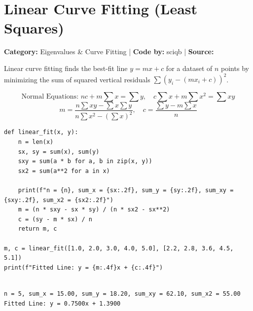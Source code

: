 \documentclass[10pt,a4paper]{report}
\begin{document}
\newpage


\section{Linear Curve Fitting (Least Squares)}
\textbf{Category:} \textcolor{secondary}{Eigenvalues \& Curve Fitting} \quad | \quad \textbf{Code by:} \textcolor{secondary}{sciqb} \quad | \quad \textbf{Source:} \texttt{}

Linear curve fitting finds the best-fit line $y = mx + c$ for a dataset of $n$ points by minimizing the sum of squared vertical residuals $\sum (y_i - (mx_i + c))^2$.

\begin{tcolorbox}[colback=theorybg,colframe=theoryframe,title=\textbf{Mathematical Theory \& Formulation},boxrule=1pt,arc=2mm]
\[
\text{Normal Equations: } n c + m \sum x = \sum y, \quad c \sum x + m \sum x^2 = \sum x y
\]
\[
m = \frac{n \sum xy - \sum x \sum y}{n \sum x^2 - (\sum x)^2}, \quad c = \frac{\sum y - m \sum x}{n}
\]
\end{tcolorbox}

\begin{tcolorbox}[colback=codebg,colframe=secondary,title=\textbf{Python Implementation (Step-by-Step Functions)},boxrule=1pt,arc=2mm]
\begin{lstlisting}[style=python_detailed]
def linear_fit(x, y):
    n = len(x)
    sx, sy = sum(x), sum(y)
    sxy = sum(a * b for a, b in zip(x, y))
    sx2 = sum(a**2 for a in x)

    print(f"n = {n}, sum_x = {sx:.2f}, sum_y = {sy:.2f}, sum_xy = {sxy:.2f}, sum_x2 = {sx2:.2f}")
    m = (n * sxy - sx * sy) / (n * sx2 - sx**2)
    c = (sy - m * sx) / n
    return m, c

m, c = linear_fit([1.0, 2.0, 3.0, 4.0, 5.0], [2.2, 2.8, 3.6, 4.5, 5.1])
print(f"Fitted Line: y = {m:.4f}x + {c:.4f}")


\end{lstlisting}
\end{tcolorbox}

\begin{tcolorbox}[colback=termbg,colframe=primary,title=\textbf{Program Execution Output \& Convergence Table},boxrule=1pt,arc=2mm]
\begin{lstlisting}[style=terminal_output]
n = 5, sum_x = 15.00, sum_y = 18.20, sum_xy = 62.10, sum_x2 = 55.00
Fitted Line: y = 0.7500x + 1.3900
\end{lstlisting}
\end{tcolorbox}
\end{document}
